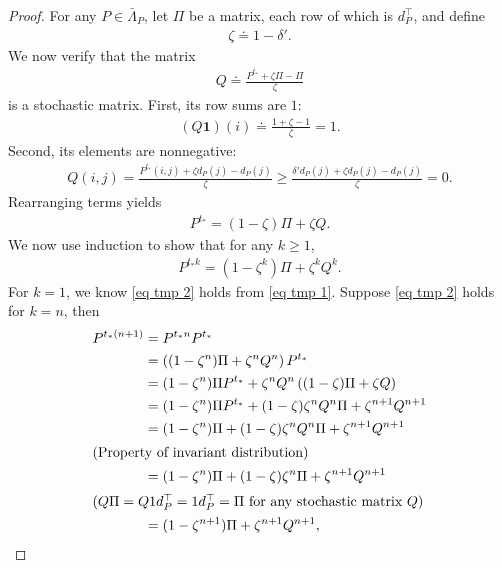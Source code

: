 \documentclass[twoside,11pt]{article}
\newcommand{\tb}[1]{{\textbf{#1}}}
\numberwithin{assucounter}{section}
\begin{document}
\begin{proof}
  For any $P \in \bar \Lambda_P$,
  let $\Pi$ be a matrix, each row of which is $d_P^\top$, 
  and define
  \begin{align}
      \zeta \doteq 1 - \delta'.
  \end{align}
  We now verify that the matrix
  \begin{align}
      Q \doteq \frac{P^{t_*} + \zeta \Pi - \Pi}{\zeta}
  \end{align}
  is a stochastic matrix.
  First, its row sums are $1$:
  \begin{align}
    (Q\tb{1})(i) \doteq \frac{1 + \zeta - 1}{\zeta} = 1.
  \end{align}
  Second,
  its elements are nonnegative:
  \begin{align}
   Q(i, j) = \frac{P^{t_*}(i, j) + \zeta d_P(j) - d_P(j)}{\zeta} \geq \frac{\delta' d_P(j) + \zeta d_P(j) - d_P(j)}{\zeta} = 0.
  \end{align}
  Rearranging terms yields
  \begin{align}
      \label{eq tmp 1}
      P^{t_*} = (1 - \zeta)\Pi + \zeta Q.
  \end{align}
  We now use induction to show that for any $k \geq 1$,
  \begin{align}
    \label{eq tmp 2}
      P^{t_*k} = (1 - \zeta^k) \Pi + \zeta^k Q^k.
  \end{align}
  For $k=1$, we know \eqref{eq tmp 2} holds from \eqref{eq tmp 1}.
  Suppose \eqref{eq tmp 2} holds for $k=n$,
  then 
  \begin{align}
      P^{t_*(n+1)} &= P^{t_*n}P^{t_*} \\
      &= \left((1 - \zeta^n) \Pi + \zeta^n Q^n \right) P^{t_*} \\
      &= (1 - \zeta^n) \Pi P^{t_*} + \zeta^n Q^n \left((1 - \zeta)\Pi + \zeta Q\right) \\
      &= (1 - \zeta^n) \Pi P^{t_*} + (1 - \zeta)\zeta^n Q^n \Pi +  \zeta^{n+1} Q^{n+1} \\
      &= (1 - \zeta^n) \Pi + (1 - \zeta)\zeta^n Q^n \Pi +  \zeta^{n+1} Q^{n+1} \\
      \intertext{\hfill (Property of invariant distribution)}
      &= (1 - \zeta^n) \Pi + (1 - \zeta)\zeta^n \Pi +  \zeta^{n+1} Q^{n+1} \\
      \intertext{\hfill ($Q\Pi = Q1 d_P^\top = 1 d_P^\top = \Pi$ for any stochastic matrix $Q$)}
      &= (1 - \zeta^{n+1}) \Pi + \zeta^{n+1} Q^{n+1},
  \end{align}

\end{proof}
\end{document}
